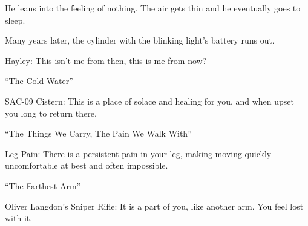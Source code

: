 He leans into the feeling of nothing.  The air gets thin and he eventually goes to sleep. 



Many years later, the cylinder with the blinking light's battery runs out. 




Hayley: This isn't me from then, this is me from now?\\[4mm]











 ``The Cold Water''

 SAC-09 Cistern: This is a place of solace and healing for you, and when upset you long to return there.



 ``The Things We Carry, The Pain We Walk With''

 Leg Pain: There is a persistent pain in your leg, making moving quickly uncomfortable at best and often impossible.



 ``The Farthest Arm''

 Oliver Langdon's Sniper Rifle: It is a part of you, like another arm. You feel lost with it.




